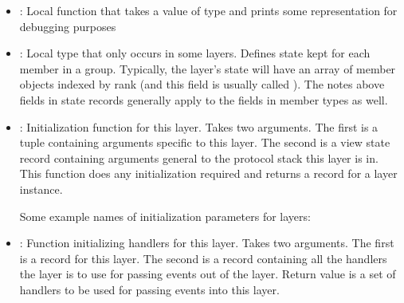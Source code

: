 \begin{itemize}
\item
{} : Local function that takes a value of type  and
prints some representation for debugging purposes

\item
{} : Local type that only occurs in some layers.  Defines
state kept for each member in a group.  Typically, the layer's state will
have an array of member objects indexed by rank (and this field is usually
called ).  The notes above fields in state records generally
apply to the fields in member types as well.

\item
{} : Initialization function for this layer.  Takes two
arguments.  The first is a tuple containing arguments specific to this
layer.  The second is a view state record containing arguments general to
the protocol stack this layer is in.  This function does any initialization
required and returns a  record for a layer instance.

Some example names of initialization parameters for layers:
\begin{itemize}
\end{itemize}

\item
{} : Function initializing handlers for this layer.  Takes two
arguments.  The first is a  record for this layer.  The second
is a record containing all the handlers the layer is to  use for passing
events out of the layer.  Return value is a set of handlers to be used for
passing events into this layer.

\end{itemize}
